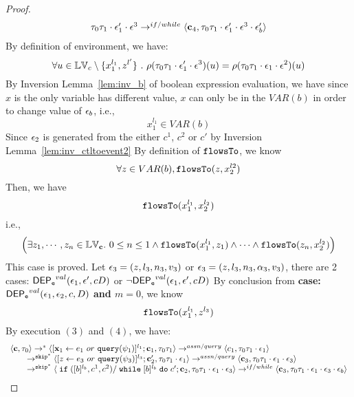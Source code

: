 \begin{proof}
\[\begin{array}{l}
{  \ensuremath{\mathtt{\tau}}_0 \ensuremath{\mathtt{\tau}}_1 \cdot \ensuremath{\mathtt{\epsilon}}_1' \cdot \ensuremath{\mathtt{\epsilon}}^3} 
  \rightarrow^{if / while} 
  \langle {\boldsymbol{\mathbf{c}}}_4,  \mathtt{\tau}_0 \mathtt{\tau}_1 \cdot \mathtt{\epsilon}_1' \cdot \mathtt{\epsilon}^3 \cdot \mathtt{\epsilon}_b' \rangle 
\end{array}
 \]
 By definition of environment, we have:
\[
  \forall u \in \mathbb{LV}_c \setminus \{x_1^{l_1}, z^{l'}\} ~.~
  \rho(\mathtt{\tau}_0 \mathtt{\tau}_1 \cdot \mathtt{\epsilon}_1' \cdot \mathtt{\epsilon}^3) (u) =  
  \rho(\mathtt{\tau}_0 \mathtt{\tau}_1 \cdot \mathtt{\epsilon}_1 \cdot \mathtt{\epsilon}^2) (u)
\]
%
By {Inversion Lemma~\ref{lem:inv_b}} of boolean expression evaluation, we have since $x$ is the only variable has different value, $x$ can only be in the $VAR(b)$ in order to change value of $\mathtt{\epsilon}_b$, i.e.,
 \[
  x_1^{l_1} \in VAR(b)
 \]
 Since $\mathtt{\epsilon}_2$ is generated from the either $c^1$, $c^2$ or $c'$ by {Inversion Lemma~\ref{lem:inv_ctltoevent2}}
 By definition of $\mathtt{flowsTo}$, we know
 \[
 \forall z \in VAR(b), \mathtt{flowsTo}(z, x_2^{l2})
 \]
 Then, we have
 \[
 \mathtt{flowsTo}(x_1^{l_1}, x_2^{l_2})
 \]
 i.e.,
 \[
 \Big( \exists z_1, \cdots, z_n \in \mathbb{LV}_{{\boldsymbol{\mathbf{c}}}}. ~ 0 \leq n \leq 1 \land
  \mathtt{flowsTo}(x_1^{l_1}, z_1) 
  \land \cdots \land \mathtt{flowsTo}(z_n, x_2^{l_2}) \Big)
 \]
  This case is proved.
%
\subcaseL{$\event_3 \in \eventset^{\asn}$}
Let $\mathtt{\epsilon}_3 = (z, l_3, n_3, v_3)$ or $\mathtt{\epsilon}_3 = (z, l_3, n_3, \alpha_3, v_3)$, there are 2 cases:
$\mathsf{DEP_{\mathtt{e}}}^{val}(\mathtt{\epsilon}_1, \mathtt{\epsilon}', c D)$ or $\neg \mathsf{DEP_{\mathtt{e}}}^{val}(\mathtt{\epsilon}_1, \mathtt{\epsilon}', c D)$
%
%
By conclusion from \textbf{case: $\mathsf{DEP_{\mathtt{e}}}^{val}(\mathtt{\epsilon}_1, \mathtt{\epsilon}_2, c, D)$ and $m = 0$}, we know
\[
  \mathtt{flowsTo}(x_1^{l_1}, z^{l_3})
\]
%
By execution $(3)$ and $(4)$, we have:
\[
  \begin{array}{l}   
  \langle {\boldsymbol{\mathbf{c}}}, \mathtt{\tau}_0 \rangle 
  \rightarrow^{*} 
  \langle [\mathrel{ {\boldsymbol{\mathbf{x}}}_1 \leftarrow e_1~ or ~ {\tt query}(\psi_1) }]^{l_1} ; {\boldsymbol{\mathbf{c}}}_1, \mathtt{\tau}_0 \mathtt{\tau}_1 \rangle  \rightarrow^{assn/query}
 \langle c_1, \mathtt{\tau}_0 \mathtt{\tau}_1 \cdot \mathtt{\epsilon}_1 \rangle 
  \\ 
  \qquad \rightarrow^{\mathtt{skip}^*} 
  \langle [\mathrel{ z \leftarrow e_3~ or ~ {\tt query}(\psi_3) }]^{l_3}; {\boldsymbol{\mathbf{c}}}_2', 
  \mathtt{\tau}_0 \mathtt{\tau}_1 \cdot \mathtt{\epsilon}_1 \rangle 
  \rightarrow^{assn / query} 
  \langle {\boldsymbol{\mathbf{c}}}_3,  \mathtt{\tau}_0 \mathtt{\tau}_1 \cdot \mathtt{\epsilon}_1 \cdot \mathtt{\epsilon}_3 \rangle 
  \\ 
  \qquad \rightarrow^{\mathtt{skip}^*} 
  \langle \;\mathtt{if}\;([b]{}^{l_b}, c^1, c^2) / \;\mathtt{while}\; [b]{}^{l_b} \;\mathtt{do}\; c'; {\boldsymbol{\mathbf{c}}}_2, 
  \mathtt{\tau}_0 \mathtt{\tau}_1 \cdot \mathtt{\epsilon}_1 \cdot \mathtt{\epsilon}_3 \rangle 
  \rightarrow^{if / while} 
  \langle {\boldsymbol{\mathbf{c}}}_3,  \mathtt{\tau}_0 \mathtt{\tau}_1 \cdot \mathtt{\epsilon}_1 \cdot \mathtt{\epsilon}_3 \cdot \mathtt{\epsilon}_b \rangle 
\end{array}
\]
\end{proof}
